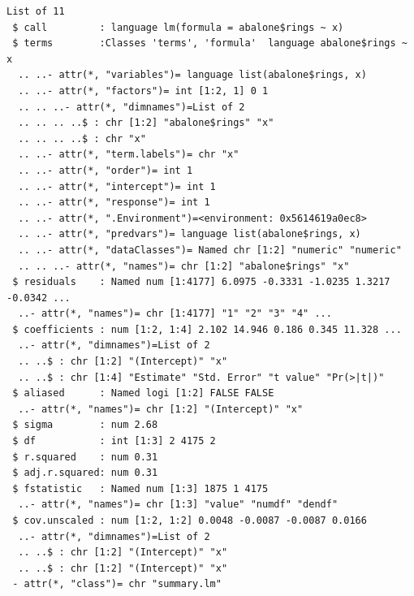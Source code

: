 \documentclass[
  11pt,
]{krantz}
\newenvironment{Shaded}{\begin{snugshade}}{\end{snugshade}}
\newcommand{\CommentTok}[1]{\textcolor[rgb]{0.37,0.37,0.37}{\textit{#1}}}
\newcommand{\ControlFlowTok}[1]{\textcolor[rgb]{0.27,0.27,0.27}{\textbf{#1}}}
\newcommand{\DecValTok}[1]{\textcolor[rgb]{0.06,0.06,0.06}{#1}}
\newcommand{\DocumentationTok}[1]{\textcolor[rgb]{0.37,0.37,0.37}{\textbf{\textit{#1}}}}
\newcommand{\FunctionTok}[1]{\textcolor[rgb]{0,0,0}{#1}}
\newcommand{\NormalTok}[1]{#1}
\newcommand{\OtherTok}[1]{\textcolor[rgb]{0.37,0.37,0.37}{#1}}
\newcommand{\SpecialCharTok}[1]{\textcolor[rgb]{0,0,0}{#1}}
\begin{document}
\begin{Shaded}
\end{Shaded}

\begin{verbatim}
List of 11
 $ call         : language lm(formula = abalone$rings ~ x)
 $ terms        :Classes 'terms', 'formula'  language abalone$rings ~ x
  .. ..- attr(*, "variables")= language list(abalone$rings, x)
  .. ..- attr(*, "factors")= int [1:2, 1] 0 1
  .. .. ..- attr(*, "dimnames")=List of 2
  .. .. .. ..$ : chr [1:2] "abalone$rings" "x"
  .. .. .. ..$ : chr "x"
  .. ..- attr(*, "term.labels")= chr "x"
  .. ..- attr(*, "order")= int 1
  .. ..- attr(*, "intercept")= int 1
  .. ..- attr(*, "response")= int 1
  .. ..- attr(*, ".Environment")=<environment: 0x5614619a0ec8> 
  .. ..- attr(*, "predvars")= language list(abalone$rings, x)
  .. ..- attr(*, "dataClasses")= Named chr [1:2] "numeric" "numeric"
  .. .. ..- attr(*, "names")= chr [1:2] "abalone$rings" "x"
 $ residuals    : Named num [1:4177] 6.0975 -0.3331 -1.0235 1.3217 -0.0342 ...
  ..- attr(*, "names")= chr [1:4177] "1" "2" "3" "4" ...
 $ coefficients : num [1:2, 1:4] 2.102 14.946 0.186 0.345 11.328 ...
  ..- attr(*, "dimnames")=List of 2
  .. ..$ : chr [1:2] "(Intercept)" "x"
  .. ..$ : chr [1:4] "Estimate" "Std. Error" "t value" "Pr(>|t|)"
 $ aliased      : Named logi [1:2] FALSE FALSE
  ..- attr(*, "names")= chr [1:2] "(Intercept)" "x"
 $ sigma        : num 2.68
 $ df           : int [1:3] 2 4175 2
 $ r.squared    : num 0.31
 $ adj.r.squared: num 0.31
 $ fstatistic   : Named num [1:3] 1875 1 4175
  ..- attr(*, "names")= chr [1:3] "value" "numdf" "dendf"
 $ cov.unscaled : num [1:2, 1:2] 0.0048 -0.0087 -0.0087 0.0166
  ..- attr(*, "dimnames")=List of 2
  .. ..$ : chr [1:2] "(Intercept)" "x"
  .. ..$ : chr [1:2] "(Intercept)" "x"
 - attr(*, "class")= chr "summary.lm"
\end{verbatim}
\end{document}
